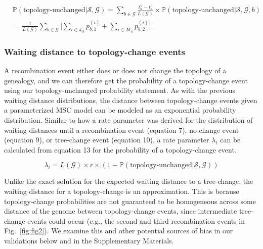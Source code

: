 \documentclass[11pt]{article}
\begin{document}
\begin{equation}
\begin{aligned}
	&\mathbb{P}(\textrm{topology-unchanged} | \mathcal{S},\mathcal{G})
	= \sum_{b \in \mathcal{G}}\frac{t_b^u - t_b^l}{L(\mathcal{G})} 
	\times 
	\mathbb{P}(\textrm{topology-unchanged} | \mathcal{S},\mathcal{G},b)
	\\
	&
	= \frac{1}{L(\mathcal{G})} \sum_{b \in \mathcal{G}}
	\bigg[ 
		\sum_{i \in \mathcal{L}_b} p_{b,1}^{(i)} +
		\sum_{i \in \mathcal{M}_b} p_{b,2}^{(i)}
	\bigg]
\end{aligned}
\end{equation}

\subsubsection{Waiting distance to topology-change events}
A recombination event either does or does not change the topology
of a genealogy, and we can therefore get the probability of a 
topology-change event using our topology-unchanged probability statement.
As with the previous waiting distance distributions, the distance between
topology-change events given a parameterized MSC model can be 
modeled as an exponential probability distribution. 
Similar to how a rate parameter was derived for the distribution 
of waiting distances until a recombination event (equation 7), 
no-change event (equation 9), or tree-change event (equation 10), 
a rate parameter $\lambda_t$ can be calculated from equation 13 for 
the probability of a topology-change event. 

\begin{equation}
	\lambda_{t} = 
	L(\mathcal{G}) \times r \times 
	(1 - \mathbb{P}(\text{topology-unchanged} | \mathcal{S},\mathcal{G}))
\end{equation}


Unlike the exact solution for the expected waiting distance to a  
tree-change, the waiting distance for a topology-change is an
approximation. This is because topology-change probabilities are not 
guaranteed to be homogeneous across some distance of the genome between 
topology-change events, since intermediate tree-change events could occur
(e.g., the second and third recombination events in Fig.~\ref{fig:fig2}).
We examine this and other potential sources of bias in our validations
below and in the Supplementary Materials.
\end{document}
